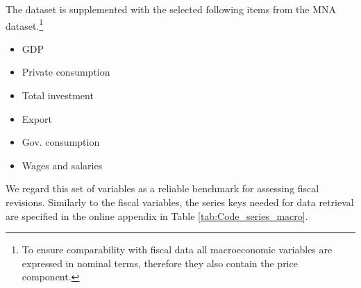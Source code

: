 The dataset is supplemented with the selected following items from the MNA dataset.\footnote{To ensure comparability with fiscal data all macroeconomic variables are expressed in nominal terms, therefore they also contain the price component.} 
\begin{itemize}
    \item GDP
    \item {{Private consumption}}
    \item {{Total investment}}
    \item {{Export}}
    \item {{Gov. consumption}}
    \item {{Wages and salaries}}
\end{itemize}

We regard this set of variables as a reliable benchmark for assessing fiscal revisions. Similarly to the fiscal variables, the series keys needed for data retrieval are specified in the online appendix in Table \ref{tab:Code_series_macro}.


